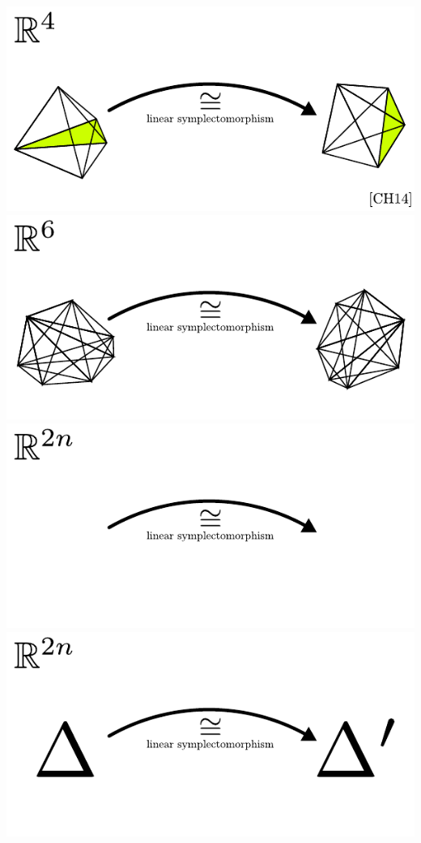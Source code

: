 \documentclass[compress]{beamer}
\begin{document}
\begin{frame}
\begin{center}
\begin{overprint}
      \includegraphics[scale=1.0]{../img/introduction/08.pdf}
      \includegraphics[scale=1.0]{../img/introduction/09.pdf}
      \includegraphics[scale=1.0]{../img/introduction/10.pdf}
      \includegraphics[scale=1.0]{../img/introduction/11.pdf}

\end{overprint}
\end{center}
\end{frame}
\end{document}
